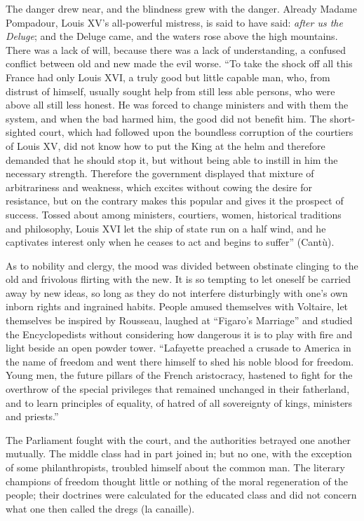 \documentclass[12pt,a4paper,openany]{book}
\newcommand{\opage}[1]{\marginnote{\footnotesize\textit{[#1]}}}
\begin{document}
The danger drew near, and the blindness grew with
the danger. Already Madame Pompadour, Louis XV's all-powerful
mistress, is said to have said: \emph{after us
the Deluge}; and the Deluge came, and the waters
rose above the high mountains. There was a lack of
will, because there was a lack of understanding, a confused
conflict between old and new made the
evil worse. ``To take the shock off all this
France had only Louis XVI, a truly good but little
capable man, who, from distrust of himself, usually
sought help from still less able persons, who
were above all still less honest. He was forced
to change ministers and with them the system, and when the
bad harmed him, the good did not benefit him.
The short-sighted court, which had followed upon the boundless
corruption of the courtiers of Louis XV, did not know
how to put the King at the helm and therefore demanded
that he should stop it, but without being able to
instill in him the necessary strength. Therefore the government displayed
that mixture of arbitrariness and weakness, %
which excites without cowing the desire for resistance, but
on the contrary makes this popular and gives it the prospect
\setcounter{footnote}{0}%
\opage{86}of success. Tossed about among ministers, courtiers,
women, historical traditions and philosophy, Louis
XVI let the ship of state run on a half wind, and
he captivates interest only when he ceases
to act and begins to suffer'' (Cantù).

As to nobility and clergy, the mood was
divided between obstinate clinging to the old
and frivolous flirting with the new. It is so tempting
to let oneself be carried away by new ideas, so long as they do not
interfere disturbingly with one's own inborn rights
and ingrained habits. People amused themselves with Voltaire,
let themselves be inspired by Rousseau, laughed at ``Figaro's
Marriage'' and studied the Encyclopedists without
considering how dangerous it is to play with fire and light
beside an open powder tower. ``Lafayette preached a crusade
to America in the name of freedom and went there himself
to shed his noble blood for freedom. Young men, %
the future pillars of the French aristocracy, hastened
to fight for the overthrow of the special privileges
that remained unchanged in their fatherland, and
to learn principles of equality, of hatred of all
sovereignty of kings, ministers and priests.''

The Parliament fought with the court, and the authorities
betrayed one another mutually. The middle class had in
part joined in; but no one, with the exception of
some philanthropists, troubled himself about the common man.
The literary champions of freedom thought little or
nothing of the moral regeneration of the people; their doctrines
were calculated for the educated class and
did not concern what one then called the dregs (la
canaille).
\end{document}
